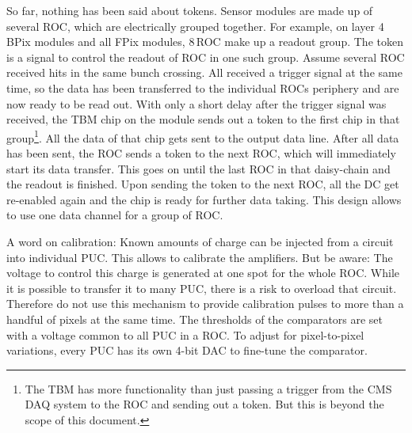 So far, nothing has been said about tokens. Sensor modules are made up of several \gls{ROC}, which are electrically grouped together. For example, on layer 4 BPix modules and all FPix modules, 8\,\gls{ROC} make up a readout group. The token is a signal to control the readout of \gls{ROC} in one such group. Assume several \gls{ROC} received hits in the same bunch crossing. All received a trigger signal at the same time, so the data has been transferred to the individual ROCs periphery and are now ready to be read out. With only a short delay after the trigger signal was received, the \gls{TBM} chip on the module sends out a token to the first chip in that group\footnote{The \gls{TBM} has more functionality than just passing a trigger from the CMS DAQ system to the \gls{ROC} and sending out a token. But this is beyond the scope of this document.}. All the data of that chip gets sent to the output data line. After all data has been sent, the \gls{ROC} sends a token to the next \gls{ROC}, which will immediately start its data transfer. This goes on until the last \gls{ROC} in that daisy-chain and the readout is finished. Upon sending the token to the next \gls{ROC}, all the \gls{DC} get re-enabled again and the chip is ready for further data taking. This design allows to use one data channel for a group of \gls{ROC}.

A word on calibration: Known amounts of charge can be injected from a circuit into individual \gls{PUC}. This allows to calibrate the amplifiers. But be aware: The voltage to control this charge is generated at one spot for the whole \gls{ROC}. While it is possible to transfer it to many \gls{PUC}, there is a risk to overload that circuit. Therefore do not use this mechanism to provide calibration pulses to more than a handful of pixels at the same time. The thresholds of the comparators are set with a voltage common to all \gls{PUC} in a \gls{ROC}. To adjust for pixel-to-pixel variations, every \gls{PUC} has its own 4-bit DAC to fine-tune the comparator.

